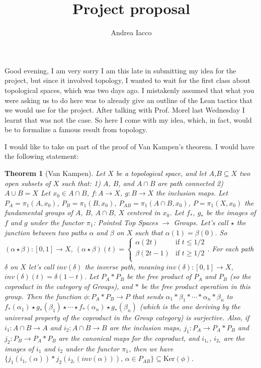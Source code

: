 \documentclass[12pt,a4paper]{article}
\title{Project proposal}
\author{Andrea Iacco}
\newtheorem*{theorem}{Theorem}
\begin{document}
\maketitle

Good evening, I am very sorry I am this late in submitting my idea for the project, but since it involved topology, I wanted to wait for the first class about topological spaces, which was two days ago.
I mistakenly assumed that what you were asking us to do here was to already give an outline of the Lean tactics that we would use for the project. After talking with Prof. Morel last Wednesday I learnt that 
was not the case. So here I come with my idea, which, in fact, would be to formalize a famous result from topology.

I would like to take on part of the proof of Van Kampen's theorem. I would have the following statement:
\begin{theorem}[Van Kampen]
Let $X$ be a topological space, and let $A$,$B \subseteq X$ two open subsets of $X$ such that:
1) $A$, $B$, and $A \cap B$ are path connected
2) $A \cup B = X$
Let $x_0 \in A \cap B$, $f: A \to X$, $g: B \to X$ the inclusion maps. Let $P_A = \pi_1 (A,x_0)$, $P_B = \pi_1 (B,x_0)$, $P_{AB} = \pi_1 (A \cap B,x_0)$, $P = \pi_1 (X,x_0)$ the fundamental groups of $A$, $B$, $A \cap B$, $X$ centered in $x_0$.
Let $f_\ast$, $g_\ast$ be the images of $f$ and $g$ under the functor $\pi_1$: Pointed Top Spaces $\to$ Groups. Let's call $\star$ the junction between two paths $\alpha$ and $\beta$ on $X$ such that $\alpha(1) = \beta(0)$. 
So $(\alpha \star \beta): [0,1] \to X$, $(\alpha \star \beta)(t) = \begin{cases}
\alpha(2t) & \text{if } t \leq 1/2\\ 
\beta(2t-1) & \text{if } t \geq 1/2\\
\end{cases}$. For each path $\delta$ on $X$ let's call $inv(\delta)$ the inverse path,
meaning $inv(\delta): [0,1] \to X$, $inv(\delta)(t) = \delta(1-t)$. 
Let $P_A \ast P_B$ be the free product of $P_A$ and $P_B$ (so the coproduct in the category of Groups), and $\ast$ be the free product operation in this group. Then the function $\phi: P_A \ast P_B \to P$ that sends 
$\alpha_1 \ast \beta_1 \ast \cdots \ast \alpha_n \ast \beta_n$ to $f_\ast (\alpha_1) \star g_\ast (\beta_1) \star \cdots \star f_\ast (\alpha_n) \star g_\ast (\beta_n)$ (which is the one deriving by the universal property of 
the coproduct in the Group category) is surjective.
Also, if $i_1: A \cap B \to A$ and $i_2 : A \cap B \to B$ are the inclusion maps, $j_1: P_A \to P_A \ast P_B$ and $j_2: P_B \to P_A \ast P_B$ are the canonical maps for the coproduct, 
and $i_{1_\ast}$, $i_{2_\ast}$ are the images of $i_1$ and $i_2$ under the functor $\pi_1$, then we have $\{j_1(i_{1_\ast}(\alpha)) \ast j_2(i_{2_\ast}(inv(\alpha))),\, \alpha \in P_{AB}\} \subseteq \mathrm{Ker}(\phi)$.
\end{theorem}
\end{document}

